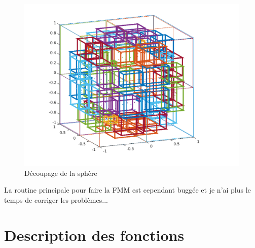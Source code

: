 \documentclass[11pt]{article}
\begin{document}
\begin{figure}
  \centering
  \includegraphics[height=0.35\textheight]{partsph}
  \caption{Découpage de la sphère}
  \label{fig:part}
\end{figure}

La routine principale pour faire la FMM est cependant buggée et je n'ai plus le temps de corriger les problèmes...

\appendix

\section{Description des fonctions }
\end{document}
